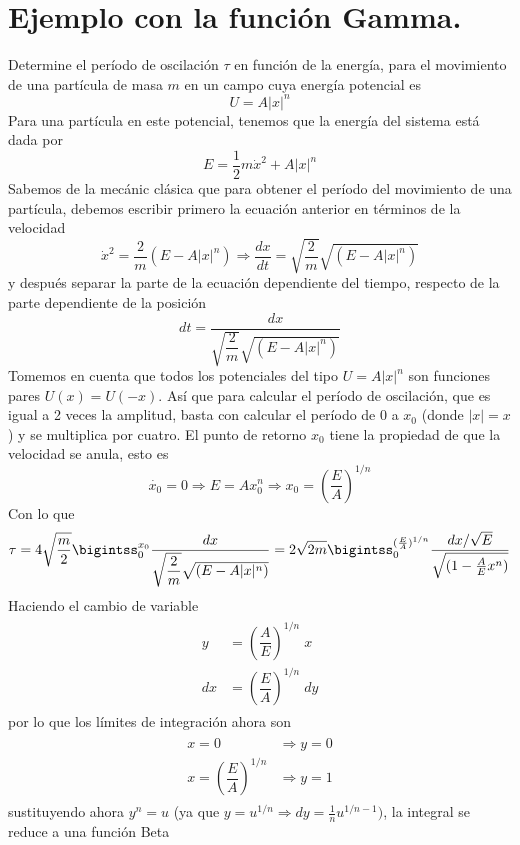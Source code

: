 \section{Ejemplo con la función Gamma.}
Determine el período de oscilación $\tau$ en función de la energía, para el movimiento de una partícula de masa $m$ en un campo cuya energía potencial es
\[  U = A \vert x \vert^{n}  \]
Para una partícula en este potencial, tenemos que la energía del sistema está dada por
\[ E = \dfrac{1}{2} m \dot{x}^{2} +  A \vert x \vert^{n} \]
Sabemos de la mecánic clásica que para obtener el período del movimiento de una partícula, debemos escribir primero la ecuación anterior en términos de la velocidad
\[ \dot{x}^{2} = \dfrac{2}{m} \left( E - A \vert x \vert^{n} \right) \Rightarrow \dfrac{dx}{dt} =  \sqrt{\dfrac{2}{m}} \sqrt{\left( E - A \vert x \vert^{n} \right)} \]
y después separar la parte de la ecuación dependiente del tiempo, respecto de la parte dependiente de la posición
\[ dt = \dfrac{dx}{\sqrt{\dfrac{2}{m}} \sqrt{\left( E - A \vert x \vert^{n} \right)}} \]
Tomemos en cuenta que todos los potenciales del tipo $U = A \vert x \vert^{n}$ son funciones pares $U(x) =  U(-x)$. Así que para calcular el período de oscilación, que es igual a 2 veces la amplitud, basta con calcular el período de $0$ a $x_{0}$ (donde $\vert x \vert = x$) y se multiplica por cuatro. El punto de retorno $x_{0}$ tiene la propiedad de que la velocidad se anula, esto es
\[ \dot{x_{0}} = 0 \Rightarrow E = A x_{0}^{n} \Rightarrow x_{0} = \left( \dfrac{E}{A} \right)^{1/n} \]
Con lo que
\[ \tau =  4 \sqrt{\dfrac{m}{2}} \bigintss_{0}^{x_{0}} \dfrac{dx}{\sqrt{\dfrac{2}{m}} \sqrt{\left( E - A \vert x \vert^{n} \right)}} = 2 \sqrt{2m} \bigintss_{0}^{(\frac{E}{A})^{1/n}} \dfrac{dx / \sqrt{E}}{\sqrt{(1 - \frac{A}{E} x^{n})}} \]
Haciendo el cambio de variable
\begin{eqnarray}
\begin{aligned}
y &= \left( \dfrac{A}{E} \right)^{1/n} \; x \\
dx &= \left( \dfrac{E}{A} \right)^{1/n} \; dy
\end{aligned}
\end{eqnarray}
por lo que los límites de integración ahora son
\begin{eqnarray}
\begin{aligned}
x = 0 & \Rightarrow y = 0 \\
x = \left( \dfrac{E}{A} \right)^{1/n} & \Rightarrow y = 1
\end{aligned}
\end{eqnarray}
sustituyendo ahora $y^{n} = u$ (ya que $y = u^{1/n} \Rightarrow dy = \frac{1}{n} u^{1/n - 1})$, la integral se reduce a una función Beta
